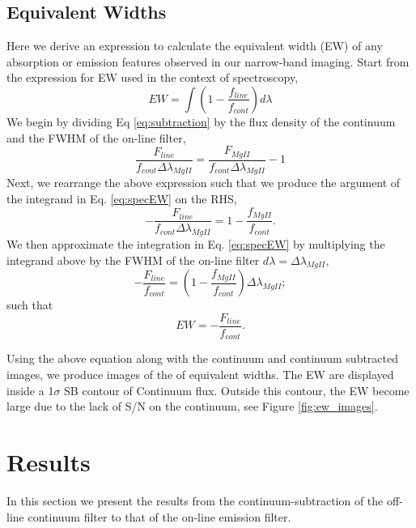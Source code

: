 \documentclass[twocolumn]{aastex6}
\begin{document}
\subsection{Equivalent Widths}
Here we derive an expression to calculate the equivalent width (EW) of any absorption or emission features observed in our narrow-band imaging. Start from the expression for EW used in the context of spectroscopy,
\begin{equation}
EW=\int (1-\frac{f_{line}}{f_{cont}})d\lambda
\label{eq:specEW}
\end{equation}
We begin by dividing Eq \ref{eq:subtraction} by the flux density of the continuum and the FWHM of the on-line filter,
\begin{equation}
\frac{F_{line}}{f_{cont}\Delta \lambda_{MgII}}=\frac{F_{MgII}}{f_{cont}\Delta \lambda_{MgII}}- 1
\end{equation}
Next, we rearrange the above expression such that we produce the argument of the integrand in Eq. \ref{eq:specEW} on the RHS,
\begin{equation}
-\frac{F_{line}}{f_{cont}\Delta \lambda_{MgII}}=1-\frac{f_{MgII}}{f_{cont}}.
\end{equation}
We then approximate the integration in Eq. \ref{eq:specEW} by multiplying the integrand above by the FWHM of the on-line filter $d\lambda=\Delta \lambda_{MgII},$
\begin{equation}
-\frac{F_{line}}{f_{cont}}=(1-\frac{f_{MgII}}{f_{cont}})\Delta \lambda_{MgII};
\end{equation}
such that
\begin{equation}
EW=-\frac{F_{line}}{f_{cont}}.
\end{equation}

Using the above equation along with the continuum and continuum subtracted images, we produce images of the of equivalent widths. The EW are displayed inside a 1$\sigma$ SB contour of Continuum flux. Outside this contour, the EW become large due to the lack of S/N on the continuum, see Figure \ref{fig:ew_images}. 

\section{Results}
In this section we present the results from the continuum-subtraction of the off-line continuum filter to that of the on-line emission filter. 
\end{document}
